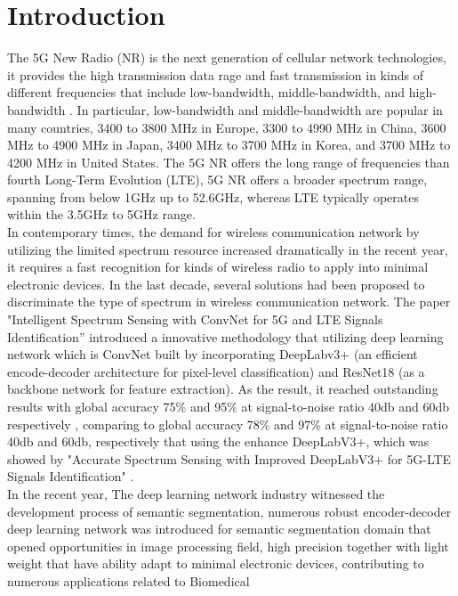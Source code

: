 \documentclass[journal]{IEEEtran} %
\begin{document}
\section{Introduction}
The 5G New Radio (NR) is the next generation of cellular network technologies, it provides the high transmission data rage and fast transmission in kinds of different frequencies that include low-bandwidth, middle-bandwidth, and high-bandwidth \cite{b7}. In particular, low-bandwidth and middle-bandwidth are popular in many countries, 3400 to 3800 MHz in Europe, 3300 to 4990 MHz in China, 3600 MHz to 4900 MHz in Japan, 3400 MHz to 3700 MHz in Korea, and 3700 MHz to 4200 MHz in United States. The 5G NR offers the long range of frequencies than fourth Long-Term Evolution (LTE), 5G NR offers a broader spectrum range, spanning from below 1GHz up to 52.6GHz, whereas LTE typically operates within the 3.5GHz to 5GHz range.
\\
\indent
In contemporary times, the demand for wireless communication network by utilizing the limited spectrum resource increased dramatically in the recent year, it requires a fast recognition for kinds of wireless radio to apply into minimal electronic devices. In the last decade, several solutions had been proposed to discriminate the type of spectrum in wireless communication network. The paper "Intelligent Spectrum Sensing with ConvNet for 5G and LTE Signals Identification”\cite{b1} introduced a innovative methodology that utilizing deep learning network which is ConvNet built by incorporating DeepLabv3+ (an efficient encode-decoder architecture for pixel-level classification) and ResNet18 (as a backbone network for feature extraction). As the result, it reached outstanding results with global accuracy 75\% and 95\% at signal-to-noise ratio 40db and 60db respectively \cite{b1}, comparing to global accuracy 78\% and 97\% at signal-to-noise ratio 40db and 60db, respectively that using the enhance DeepLabV3+, which was showed by "Accurate Spectrum Sensing with Improved DeepLabV3+ for 5G-LTE Signals Identification" \cite{b2}.
\\
\indent
In the recent year, The deep learning network industry witnessed the development process of semantic segmentation, numerous robust encoder-decoder deep learning network was introduced for semantic segmentation domain that opened opportunities in image processing field, high precision together with light weight that have ability adapt to minimal electronic devices, contributing to numerous applications related to Biomedical
\end{document}
